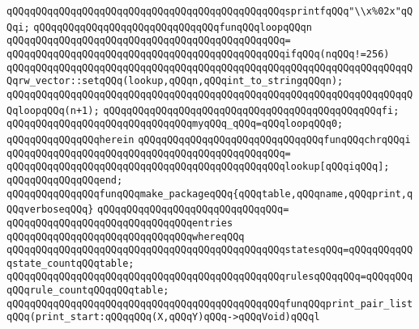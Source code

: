 \verb|qQQqqQQqqQQqqQQqqQQqqQQqqQQqqQQqqQQqqQQqqQQqqQQqsprintfqQQq"\\x%02x"qQQqi;|\newline
\newline
\verb|qQQqqQQqqQQqqQQqqQQqqQQqqQQqqQQqfunqQQqloopqQQqn|\newline
\verb|qQQqqQQqqQQqqQQqqQQqqQQqqQQqqQQqqQQqqQQqqQQqqQQq=|\newline
\verb|qQQqqQQqqQQqqQQqqQQqqQQqqQQqqQQqqQQqqQQqqQQqqQQqifqQQq(nqQQq!=256)|\newline
\verb|qQQqqQQqqQQqqQQqqQQqqQQqqQQqqQQqqQQqqQQqqQQqqQQqqQQqqQQqqQQqqQQqqQQqqQQqrw_vector::setqQQq(lookup,qQQqn,qQQqint_to_stringqQQqn);|\newline
\verb|qQQqqQQqqQQqqQQqqQQqqQQqqQQqqQQqqQQqqQQqqQQqqQQqqQQqqQQqqQQqqQQqqQQqqQQqloopqQQq(n+1);|\newline
\verb|qQQqqQQqqQQqqQQqqQQqqQQqqQQqqQQqqQQqqQQqqQQqqQQqfi;|\newline
\newline
\verb|qQQqqQQqqQQqqQQqqQQqqQQqqQQqqQQqmyqQQq_qQQq=qQQqloopqQQq0;|\newline
\newline
\verb|qQQqqQQqqQQqqQQqherein|\newline
\newline
\verb|qQQqqQQqqQQqqQQqqQQqqQQqqQQqqQQqfunqQQqchrqQQqi|\newline
\verb|qQQqqQQqqQQqqQQqqQQqqQQqqQQqqQQqqQQqqQQqqQQqqQQq=|\newline
\verb|qQQqqQQqqQQqqQQqqQQqqQQqqQQqqQQqqQQqqQQqqQQqqQQqlookup[qQQqiqQQq];|\newline
\verb|qQQqqQQqqQQqqQQqend;|\newline
\newline
\verb|qQQqqQQqqQQqqQQqfunqQQqmake_packageqQQq{qQQqtable,qQQqname,qQQqprint,qQQqverboseqQQq}|\newline
\verb|qQQqqQQqqQQqqQQqqQQqqQQqqQQqqQQq=|\newline
\verb|qQQqqQQqqQQqqQQqqQQqqQQqqQQqqQQqentries|\newline
\verb|qQQqqQQqqQQqqQQqqQQqqQQqqQQqqQQqwhereqQQq|\newline
\newline
\verb|qQQqqQQqqQQqqQQqqQQqqQQqqQQqqQQqqQQqqQQqqQQqqQQqstatesqQQq=qQQqqQQqqQQqstate_countqQQqtable;|\newline
\verb|qQQqqQQqqQQqqQQqqQQqqQQqqQQqqQQqqQQqqQQqqQQqqQQqrulesqQQqqQQq=qQQqqQQqqQQqrule_countqQQqqQQqtable;|\newline
\newline
\verb|qQQqqQQqqQQqqQQqqQQqqQQqqQQqqQQqqQQqqQQqqQQqqQQqfunqQQqprint_pair_listqQQq(print_start:qQQqqQQq(X,qQQqY)qQQq->qQQqVoid)qQQql|\newline
